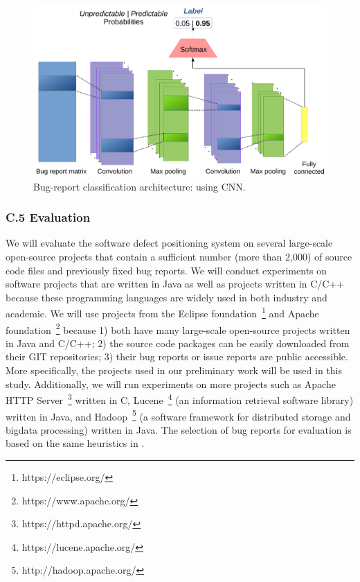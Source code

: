 \begin{figure}[t]
\centering
\includegraphics[width=\columnwidth]{figures/cnn.pdf}
\caption{Bug-report classification architecture: using CNN.}
\label{fig:cnn}
\end{figure}



\subsubsection{C.5 Evaluation}
We will evaluate the software defect positioning system on several large-scale open-source projects that contain a sufficient number (more than 2,000) of source code files and previously fixed bug reports. We will conduct experiments on software projects that are written in Java as well as projects written in C/C++ because these programming languages are widely used in both industry and academic. We will use projects from the Eclipse foundation~\footnote{https://eclipse.org/} and Apache foundation~\footnote{https://www.apache.org/} because 1) both have many large-scale open-source projects written in Java and C/C++; 2) the source code packages can be easily downloaded from their GIT repositories; 3) their bug reports or issue reports are public accessible. More specifically, the projects used in our preliminary work \cite{Ye:TSE15} will be used in this study. Additionally, we will run experiments on more projects such as Apache HTTP Server~\footnote{https://httpd.apache.org/} written in C, Lucene~\footnote{https://lucene.apache.org/} (an information retrieval software library) written in Java, and Hadoop~\footnote{http://hadoop.apache.org/} (a software framework for distributed storage and bigdata processing) written in Java. The selection of bug reports for evaluation is based on the same heuristics in \cite{Dallmeier:2007:EBL:1321631.1321702,Ye:FSE14}.

